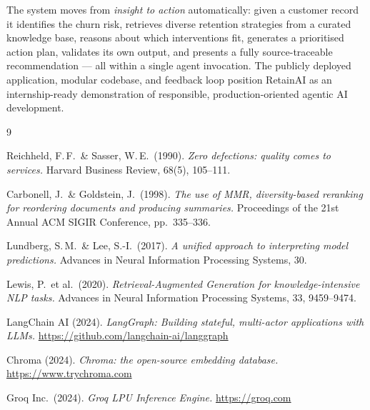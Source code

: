 \documentclass[11pt]{article}
\begin{document}
The system moves from \textit{insight to action} automatically: given a
customer record it identifies the churn risk, retrieves diverse retention
strategies from a curated knowledge base, reasons about which interventions
fit, generates a prioritised action plan, validates its own output, and
presents a fully source-traceable recommendation --- all within a single
agent invocation. The publicly deployed application, modular codebase, and
feedback loop position RetainAI as an internship-ready demonstration of
responsible, production-oriented agentic AI development.

\newpage
\begin{thebibliography}{9}
\setlength{\itemsep}{5pt}

Reichheld, F.\,F.\ \& Sasser, W.\,E.\ (1990).
\textit{Zero defections: quality comes to services.}
Harvard Business Review, 68(5), 105--111.

Carbonell, J.\ \& Goldstein, J.\ (1998).
\textit{The use of MMR, diversity-based reranking for reordering documents
and producing summaries.}
Proceedings of the 21st Annual ACM SIGIR Conference, pp.\ 335--336.

Lundberg, S.\,M.\ \& Lee, S.-I.\ (2017).
\textit{A unified approach to interpreting model predictions.}
Advances in Neural Information Processing Systems, 30.

Lewis, P.\ et al.\ (2020).
\textit{Retrieval-Augmented Generation for knowledge-intensive NLP tasks.}
Advances in Neural Information Processing Systems, 33, 9459--9474.

LangChain AI (2024).
\textit{LangGraph: Building stateful, multi-actor applications with LLMs.}
\url{https://github.com/langchain-ai/langgraph}

Chroma (2024).
\textit{Chroma: the open-source embedding database.}
\url{https://www.trychroma.com}

Groq Inc.\ (2024).
\textit{Groq LPU Inference Engine.}
\url{https://groq.com}

\end{thebibliography}
\end{document}
